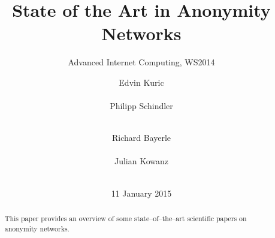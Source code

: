 \documentclass{sig-alternate}
\begin{document}
%

\title{State of the Art in Anonymity Networks}
\subtitle{Advanced Internet Computing, WS2014}

\author{
\alignauthor
Edvin Kuric\\
       \\
\alignauthor
Philipp Schindler\\
       \\
\and
\alignauthor Richard Bayerle\\
       \\
\alignauthor Julian Kowanz\\
       \\
}
\date{11 January 2015}
\maketitle


\begin{abstract}
This paper provides an overview of some state--of--the--art scientific papers on anonymity networks.
\end{abstract}

\end{document}
